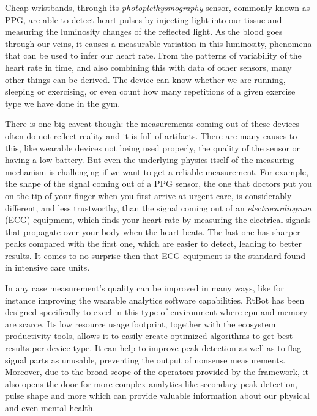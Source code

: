 \documentclass[preprint,1p,times]{elsarticle}
\begin{document}
Cheap wristbands, through its \textit{photoplethysmography} sensor, commonly known as PPG, are able to detect
heart pulses by injecting light into our tissue and measuring the luminosity changes of the reflected 
light. As the blood goes through our veins, it causes a measurable variation in this luminosity,
phenomena that can be used to infer our heart rate. From the patterns of variability of the heart 
rate in time, and also combining this with data of other sensors, many other things can be derived. 
The device can know whether we are running, sleeping or exercising, or even count how many repetitions 
of a given exercise type we have done in the gym.

There is one big caveat though: the measurements coming out of these devices often do not reflect reality 
and it is full of artifacts. There are many causes to this, like wearable devices not being used properly,
the quality of the sensor or having a low battery. But even the underlying physics itself of the measuring
mechanism is challenging if we want to get a reliable measurement. For example, the shape of the signal
coming out of a PPG sensor, the one that doctors put you on the tip of your finger when you first arrive
at urgent care, is considerably different, and less trustworthy,  than the signal coming out of an 
\textit{electrocardiogram} (ECG) equipment, which finds your heart rate by measuring the electrical signals that 
propagate over your body when the heart beats. The last one has sharper peaks compared with the first one, 
which are easier to detect, leading to better results. It comes to no surprise then that ECG equipment is 
the standard found in intensive care units.

In any case measurement's quality can be improved in many ways, like for instance improving the wearable 
analytics software capabilities. RtBot has been designed specifically to excel in this type of environment 
where cpu and memory are scarce. Its low resource usage footprint, together with the ecosystem productivity 
tools, allows it to easily create optimized algorithms to get best results per device type. It can help to 
improve peak detection as well as to flag signal parts as unusable, preventing the output of nonsense 
measurements. Moreover, due to the broad scope of the operators provided by the framework, it also opens 
the door for more complex analytics like secondary peak detection, pulse shape and more which can provide 
valuable information about our physical and even mental health.
\end{document}
